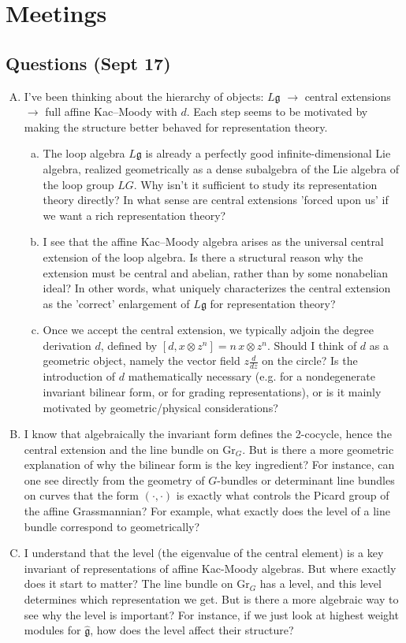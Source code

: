 \documentclass[12pt]{article}
\begin{document}
\section{Meetings}
\subsection*{Questions (Sept 17)}
\begin{enumerate}[A.]
    \item I've been thinking about the hierarchy of objects: $L\mathfrak g$ $\to$ central extensions $\to$ full affine Kac–Moody with $d$. Each step seems to be motivated by making the structure better behaved for representation theory.
        \begin{enumerate}[a)] 
            \item The loop algebra $L\mathfrak g$ is already a perfectly good infinite-dimensional Lie algebra, realized geometrically as a dense subalgebra of the Lie algebra of the loop group $LG$. Why isn't it sufficient to study its representation theory directly? In what sense are central extensions 'forced upon us' if we want a rich representation theory?
            \item I see that the affine Kac–Moody algebra arises as the universal central extension of the loop algebra. Is there a structural reason why the extension must be central and abelian, rather than by some nonabelian ideal? In other words, what uniquely characterizes the central extension as the 'correct' enlargement of $L\mathfrak g$ for representation theory?
            \item Once we accept the central extension, we typically adjoin the degree derivation $d$, defined by $[d, x\otimes z^n]=n\,x\otimes z^n$. Should I think of $d$ as a geometric object, namely the vector field $z\frac{d}{dz}$ on the circle? Is the introduction of $d$ mathematically necessary (e.g. for a nondegenerate invariant bilinear form, or for grading representations), or is it mainly motivated by geometric/physical considerations?
        \end{enumerate}
    \item I know that algebraically the invariant form defines the 2-cocycle, hence the central extension and the line bundle on $\mathrm{Gr}_G$. But is there a more geometric explanation of why the bilinear form is the key ingredient? For instance, can one see directly from the geometry of $G$-bundles or determinant line bundles on curves that the form $(\cdot,\cdot)$ is exactly what controls the Picard group of the affine Grassmannian? For example, what exactly does the level of a line bundle correspond to geometrically?
    \item I understand that the level (the eigenvalue of the central element) is a key invariant of representations of affine Kac-Moody algebras. But where exactly does it start to matter? The line bundle on $\mathrm{Gr}_G$ has a level, and this level determines which representation we get. But is there a more algebraic way to see why the level is important? For instance, if we just look at highest weight modules for $\widehat{\mathfrak g}$, how does the level affect their structure?
\end{enumerate}
\end{document}
